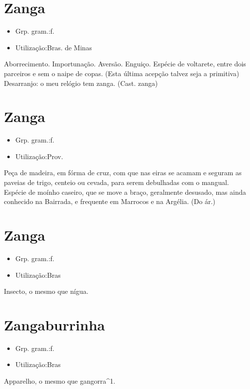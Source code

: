 \section{Zanga}
\begin{itemize}
\item {Grp. gram.:f.}
\end{itemize}
\begin{itemize}
\item {Utilização:Bras. de Minas}
\end{itemize}
Aborrecimento.
Importunação.
Aversão.
Enguiço.
Espécie de voltarete, entre dois parceiros e sem o naipe de copas. (Esta última acepção talvez seja a primitiva)
Desarranjo: \textunderscore o meu relógio tem zanga\textunderscore .
(Cast. \textunderscore zanga\textunderscore )
\section{Zanga}
\begin{itemize}
\item {Grp. gram.:f.}
\end{itemize}
\begin{itemize}
\item {Utilização:Prov.}
\end{itemize}
Peça de madeira, em fórma de cruz, com que nas eiras se acamam e seguram as paveias de trigo, centeio ou cevada, para serem debulhadas com o mangual.
Espécie de moínho caseiro, que se move a braço, geralmente desusado, mas ainda conhecido na Bairrada, e frequente em Marrocos e na Argélia.
(Do ár.)
\section{Zanga}
\begin{itemize}
\item {Grp. gram.:f.}
\end{itemize}
\begin{itemize}
\item {Utilização:Bras}
\end{itemize}
Insecto, o mesmo que \textunderscore nígua\textunderscore .
\section{Zangaburrinha}
\begin{itemize}
\item {Grp. gram.:f.}
\end{itemize}
\begin{itemize}
\item {Utilização:Bras}
\end{itemize}
Apparelho, o mesmo que \textunderscore gangorra\textunderscore ^1.
